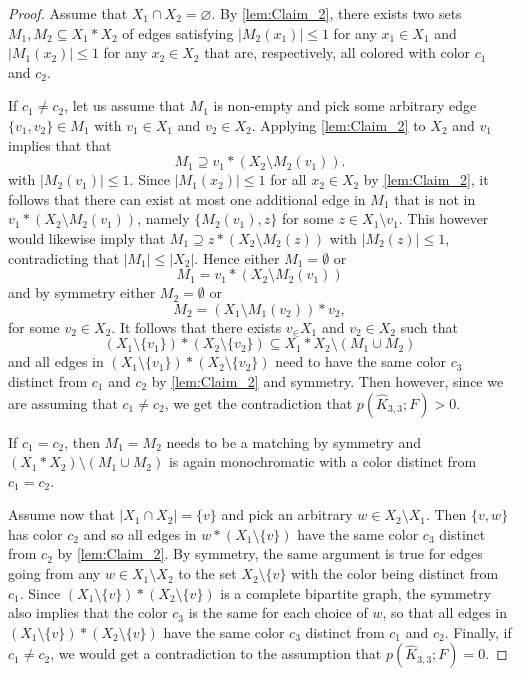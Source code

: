 \documentclass[a4paper,11pt]{article}
\numberwithin{equation}{section}
\begin{document}
\begin{proof}    
    Assume that $X_1\cap X_2 = \varnothing$. By \cref{lem:Claim_2}, there exists two sets $M_1, M_2\subseteq X_1 \ast X_2$ of edges satisfying $|M_2(x_1)| \le 1$ for any $x_1 \in X_1$ and $|M_1(x_2)| \le 1$ for any $x_2 \in X_2$  that are, respectively, all colored with color $c_1$ and $c_2$.

    If $c_1\ne c_2$, let us assume that $M_1$ is non-empty and pick some arbitrary edge $\{v_1,v_2\}\in M_1$ with $v_1\in X_1$ and $v_2\in X_2$. Applying \cref{lem:Claim_2} to $X_2$ and $v_1$ implies that that
    \[
        M_1 \supseteq v_1 \ast (X_2\setminus M_2(v_1)).
    \]
    with $|M_2(v_1)| \le 1$.
    Since $|M_1(x_2)|\le 1$ for all $x_2\in X_2$ by \cref{lem:Claim_2}, it follows that there can exist at most one additional edge in $M_1$ that is not in $v_1 \ast (X_2\setminus M_2(v_1))$, namely $\{M_2(v_1), z\}$ for some $z\in X_1\setminus v_1$. This however would likewise imply that $M_1 \supseteq z \ast (X_2 \setminus M_2(z))$ with $|M_2(z)| \le 1$, contradicting that $|M_1| \leq |X_2|$. Hence either $M_1 = \emptyset$ or
    \[
        M_1 = v_1 \ast (X_2\setminus M_2(v_1))
    \]
    and by symmetry either $M_2 = \emptyset$ or 
    \[
        M_2 = (X_1\setminus M_1(v_2)) \ast v_2,
    \]
    for some $v_2 \in X_2$.
    It follows that there exists $v_ \in X_1$ and $v_2 \in X_2$ such that
    \begin{equation*}
        (X_1\setminus\{v_1\})\ast (X_2\setminus \{v_2 \}) \subseteq X_1 \ast X_2 \setminus (M_1 \cup M_2)
    \end{equation*}
    and all edges in $(X_1\setminus\{v_1\})\ast (X_2\setminus \{v_2 \})$ need to have the same color $c_3$ distinct from $c_1$ and $c_2$ by \cref{lem:Claim_2} and symmetry. Then however, since we are assuming that $c_1 \neq c_2$, we get the contradiction that $p(\hat K_{3,3}; F) > 0$.
    
    If $c_1=c_2$, then $M_1 = M_2$ needs to be a matching by symmetry and $(X_1\ast X_2)\setminus (M_1\cup M_2)$ is again monochromatic with a color distinct from $c_1=c_2$.
    
    \medskip
    
    Assume now that $|X_1\cap X_2| = \{v\}$ and pick an arbitrary $w \in X_2 \setminus X_1$. Then $\{v,w\}$ has color $c_2$ and so all edges in $w \ast (X_1 \setminus \{v\})$ have the same color $c_3$ distinct from $c_2$ by \cref{lem:Claim_2}. By symmetry, the same argument is true for edges going from any $w\in X_1\setminus X_2$ to the set $X_2\setminus \{v\}$ with the color being distinct from $c_1$. Since $(X_1\setminus \{v\})\ast (X_2\setminus \{v\})$ is a complete bipartite graph, the symmetry also implies that the color $c_3$ is the same for each choice of $w$, so that all edges in $(X_1\setminus \{v\})\ast (X_2\setminus \{v\})$ have the same color $c_3$ distinct from $c_1$ and $c_2$. Finally, if $c_1 \ne c_2$, we would get a contradiction to the assumption that $p(\hat K_{3,3};F) = 0$.


\end{proof}
\end{document}
